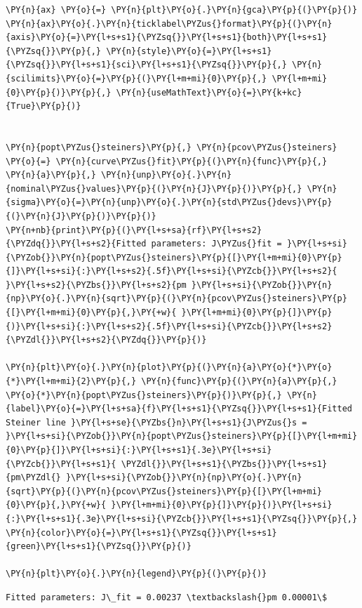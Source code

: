 \begin{tcolorbox}[breakable, size=fbox, boxrule=1pt, pad at break*=1mm,colback=cellbackground, colframe=cellborder]
\begin{Verbatim}[commandchars=\\\{\}]
\PY{n}{ax} \PY{o}{=} \PY{n}{plt}\PY{o}{.}\PY{n}{gca}\PY{p}{(}\PY{p}{)}
\PY{n}{ax}\PY{o}{.}\PY{n}{ticklabel\PYZus{}format}\PY{p}{(}\PY{n}{axis}\PY{o}{=}\PY{l+s+s1}{\PYZsq{}}\PY{l+s+s1}{both}\PY{l+s+s1}{\PYZsq{}}\PY{p}{,} \PY{n}{style}\PY{o}{=}\PY{l+s+s1}{\PYZsq{}}\PY{l+s+s1}{sci}\PY{l+s+s1}{\PYZsq{}}\PY{p}{,} \PY{n}{scilimits}\PY{o}{=}\PY{p}{(}\PY{l+m+mi}{0}\PY{p}{,} \PY{l+m+mi}{0}\PY{p}{)}\PY{p}{,} \PY{n}{useMathText}\PY{o}{=}\PY{k+kc}{True}\PY{p}{)}


\PY{n}{popt\PYZus{}steiners}\PY{p}{,} \PY{n}{pcov\PYZus{}steiners} \PY{o}{=} \PY{n}{curve\PYZus{}fit}\PY{p}{(}\PY{n}{func}\PY{p}{,} \PY{n}{a}\PY{p}{,} \PY{n}{unp}\PY{o}{.}\PY{n}{nominal\PYZus{}values}\PY{p}{(}\PY{n}{J}\PY{p}{)}\PY{p}{,} \PY{n}{sigma}\PY{o}{=}\PY{n}{unp}\PY{o}{.}\PY{n}{std\PYZus{}devs}\PY{p}{(}\PY{n}{J}\PY{p}{)}\PY{p}{)}
\PY{n+nb}{print}\PY{p}{(}\PY{l+s+sa}{rf}\PY{l+s+s2}{\PYZdq{}}\PY{l+s+s2}{Fitted parameters: J\PYZus{}fit = }\PY{l+s+si}{\PYZob{}}\PY{n}{popt\PYZus{}steiners}\PY{p}{[}\PY{l+m+mi}{0}\PY{p}{]}\PY{l+s+si}{:}\PY{l+s+s2}{.5f}\PY{l+s+si}{\PYZcb{}}\PY{l+s+s2}{ }\PY{l+s+s2}{\PYZbs{}}\PY{l+s+s2}{pm }\PY{l+s+si}{\PYZob{}}\PY{n}{np}\PY{o}{.}\PY{n}{sqrt}\PY{p}{(}\PY{n}{pcov\PYZus{}steiners}\PY{p}{[}\PY{l+m+mi}{0}\PY{p}{,}\PY{+w}{ }\PY{l+m+mi}{0}\PY{p}{]}\PY{p}{)}\PY{l+s+si}{:}\PY{l+s+s2}{.5f}\PY{l+s+si}{\PYZcb{}}\PY{l+s+s2}{\PYZdl{}}\PY{l+s+s2}{\PYZdq{}}\PY{p}{)}

\PY{n}{plt}\PY{o}{.}\PY{n}{plot}\PY{p}{(}\PY{n}{a}\PY{o}{*}\PY{o}{*}\PY{l+m+mi}{2}\PY{p}{,} \PY{n}{func}\PY{p}{(}\PY{n}{a}\PY{p}{,} \PY{o}{*}\PY{n}{popt\PYZus{}steiners}\PY{p}{)}\PY{p}{,} \PY{n}{label}\PY{o}{=}\PY{l+s+sa}{f}\PY{l+s+s1}{\PYZsq{}}\PY{l+s+s1}{Fitted Steiner line }\PY{l+s+se}{\PYZbs{}n}\PY{l+s+s1}{J\PYZus{}s = }\PY{l+s+si}{\PYZob{}}\PY{n}{popt\PYZus{}steiners}\PY{p}{[}\PY{l+m+mi}{0}\PY{p}{]}\PY{l+s+si}{:}\PY{l+s+s1}{.3e}\PY{l+s+si}{\PYZcb{}}\PY{l+s+s1}{ \PYZdl{}}\PY{l+s+s1}{\PYZbs{}}\PY{l+s+s1}{pm\PYZdl{} }\PY{l+s+si}{\PYZob{}}\PY{n}{np}\PY{o}{.}\PY{n}{sqrt}\PY{p}{(}\PY{n}{pcov\PYZus{}steiners}\PY{p}{[}\PY{l+m+mi}{0}\PY{p}{,}\PY{+w}{ }\PY{l+m+mi}{0}\PY{p}{]}\PY{p}{)}\PY{l+s+si}{:}\PY{l+s+s1}{.3e}\PY{l+s+si}{\PYZcb{}}\PY{l+s+s1}{\PYZsq{}}\PY{p}{,} \PY{n}{color}\PY{o}{=}\PY{l+s+s1}{\PYZsq{}}\PY{l+s+s1}{green}\PY{l+s+s1}{\PYZsq{}}\PY{p}{)}

\PY{n}{plt}\PY{o}{.}\PY{n}{legend}\PY{p}{(}\PY{p}{)}
\end{Verbatim}
\end{tcolorbox}

    \begin{Verbatim}[commandchars=\\\{\}]
Fitted parameters: J\_fit = 0.00237 \textbackslash{}pm 0.00001\$
    \end{Verbatim}

